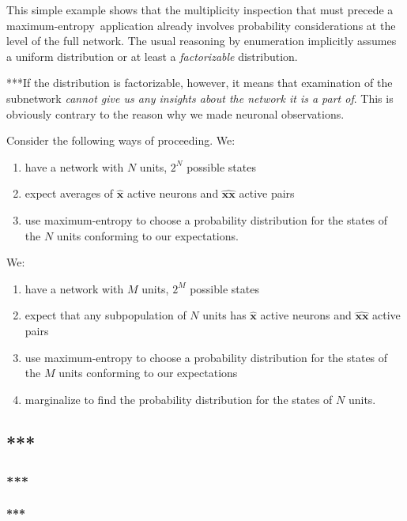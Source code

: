 \documentclass{article}
\newcommand*{\sav}{\widehat} %
\newcommand*{\yxx}{x}
\newcommand*{\yx}{\bm{\yxx}}%
\newcommand*{\yxs}{\sav{\yx}}%
\newcommand*{\yxxs}{\sav{\yx\yx}}
\newcommand*{\yN}{N}
\newcommand*{\yM}{M}
\newcommand*{\me}{maximum-entropy}
\begin{document}
This simple example shows that the multiplicity inspection that must
precede a \me\ application already involves probability considerations at
the level of the full network. The usual reasoning by enumeration
implicitly assumes a uniform distribution or at least a \emph{factorizable}
distribution.

***If the distribution is factorizable, however, it means that examination of
the subnetwork \emph{cannot give us any insights about the network it is a
  part of}. This is obviously contrary to the reason why we made neuronal observations.

Consider the following ways of proceeding. We:
\begin{enumerate}
\item have a network with $\yN$ units, $2^{\yN}$ possible states
\item expect averages of $\yxs$ active neurons and $\yxxs$ active pairs
\item use maximum-entropy to choose a probability distribution for the
  states of the $\yN$ units conforming to our expectations.
\end{enumerate}

We:
\begin{enumerate}
\item have a network with $\yM$ units, $2^{\yM}$ possible states
\item expect that any subpopulation of $\yN$ units has $\yxs$ active
  neurons and $\yxxs$ active pairs
\item use maximum-entropy to choose a probability distribution for the
  states of the $\yM$ units conforming to our expectations
\item marginalize to find the probability distribution for the states of
  $\yN$ units.
\end{enumerate}


\subsection{***}


\subsubsection{***}


\paragraph{***}

\end{document}
